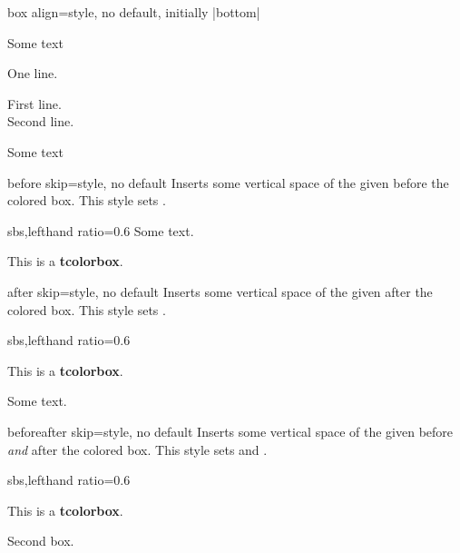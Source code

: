 \begin{docTcbKey}[][doc new=2014-10-10]{box align}{=}{style, no default, initially |bottom|}
\begin{dispExample}
Some text\dotfill
\begin{tcolorbox}[box align=center]
One line.
\end{tcolorbox}
\begin{tcolorbox}[box align=center]
First line.\\Second line.
\end{tcolorbox}
\end{dispExample}

\begin{dispExample}
Some text\dotfill
{}
\end{dispExample}
\end{docTcbKey}


\begin{docTcbKey}[][doc new and updated={2014-10-10}{2015-03-16}]{before skip}{=}{style, no default}
  Inserts some vertical space of the given  before the colored box.
  This style sets .
\begin{dispExample*}{sbs,lefthand ratio=0.6}
Some text.
\begin{tcolorbox}[before skip=1cm,
    colframe=red!50!white]
  This is a \textbf{tcolorbox}.
\end{tcolorbox}
\end{dispExample*}
\end{docTcbKey}

\begin{docTcbKey}[][doc new and updated={2014-10-10}{2015-03-16}]{after skip}{=}{style, no default}
  Inserts some vertical space of the given  after the colored box.
  This style sets .
\begin{dispExample*}{sbs,lefthand ratio=0.6}
\begin{tcolorbox}[after skip=1cm,
    colframe=red!50!white]
  This is a \textbf{tcolorbox}.
\end{tcolorbox}
Some text.
\end{dispExample*}
\end{docTcbKey}

\begin{docTcbKey}[][doc new=2014-10-10]{beforeafter skip}{=}{style, no default}
  Inserts some vertical space of the given  before \emph{and} after the colored box.
  This style sets  and .
\begin{dispExample*}{sbs,lefthand ratio=0.6}
\begin{tcolorbox}
  This is a \textbf{tcolorbox}.
\end{tcolorbox}
\begin{tcolorbox}
  Second box.
\end{tcolorbox}
\end{dispExample*}
\end{docTcbKey}

